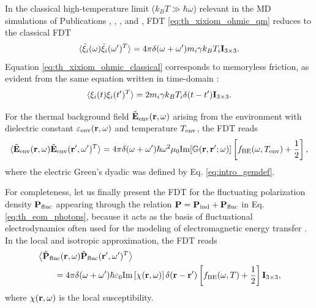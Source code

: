 In the classical high-temperature limit ($k_B T \gg \hbar \omega$) relevant in the MD simulations of Publications , , , and , FDT \eqref{eq:th_xixiom_ohmic_qm} reduces to the classical FDT
\begin{equation}
 \langle \tilde \xi_i(\omega) \tilde \xi_i(\omega')^T \rangle = 4\pi \delta(\omega+\omega') m_i \gamma k_B T_i  \mathbf{I}_{3\times 3}. \label{eq:th_xixiom_ohmic_classical}
\end{equation}
Equation \eqref{eq:th_xixiom_ohmic_classical} corresponds to memoryless friction, as evident from the same equation written in time-domain \cite{zwanzig}:
\begin{equation}
 \langle \xi_i(t)  \xi_i(t')^T \rangle = 2 m_i \gamma k_B T_i \delta(t-t') \mathbf{I}_{3\times 3}. \label{eq:th_xixit_ohmic_classical}
\end{equation}

For the thermal background field $\tilde{\mathbf{E}}_{\textrm{env}}(\mathbf{r},\omega)$ arising from the environment with dielectric constant $\varepsilon_{\textrm{env}}(\mathbf{r},\omega)$ and temperature $T_{\textrm{env}}$, the FDT reads \cite{novotny}
\begin{equation}
 \langle \tilde{\mathbf{E}}_{\textrm{env}}(\mathbf{r},\omega) \tilde{\mathbf{E}}_{\textrm{env}}(\mathbf{r}',\omega')^T \rangle = 4\pi \delta(\omega+\omega') \hbar \omega^2 \mu_0 \textrm{Im}[\mathbb{G}(\mathbf{r},\mathbf{r}';\omega)] \left[f_{\textrm{BE}}(\omega,T_{\textrm{env}})+ \frac{1}{2} \right], \label{eq:th_e0e0om}
\end{equation}
where the electric Green's dyadic was defined by Eq. \eqref{eq:intro_gemdef}. 

For completeness, let us finally present the FDT for the fluctuating polarization density $\mathbf{P}_{\textrm{fluc}}$ appearing through the relation $\mathbf{P}=\mathbf{P}_{\textrm{ind}}+\mathbf{P}_{\textrm{fluc}}$ in Eq. \eqref{eq:th_eom_photons}, because it acts as the basis of fluctuational electrodynamics \cite{rytov,lifshitz56} often used for the modeling of electromagnetic energy transfer \cite{joulain05,volokitin07}. In the local and isotropic approximation, the FDT reads \cite{novotny}
\begin{alignat}{2}
 & \left\langle \tilde{\mathbf{P}}_{\textrm{fluc}}(\mathbf{r},\omega) \tilde{\mathbf{P}}_{\textrm{fluc}}(\mathbf{r}',\omega')^T\right\rangle \notag \\
 &\qquad = 4\pi \delta(\omega+\omega') \hbar \varepsilon_0 \textrm{Im}\left[ \chi(\mathbf{r},\omega)\right] \delta(\mathbf{r}-\mathbf{r}') \left[f_{\textrm{BE}}(\omega,T)+\frac{1}{2}\right]  \mathbf{I}_{3 \times 3}, \label{eq:th_PflucPfluc}
\end{alignat}
where $\chi(\mathbf{r},\omega)$ is the local susceptibility. 

